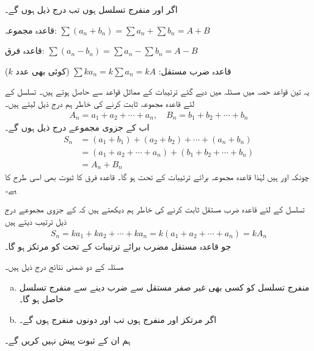 اگر  اور  منفرج تسلسل ہوں تب درج ذیل ہوں گے۔
\begin{description}
\item{قاعدہ مجموعہ:}\quad 
$\sum (a_n+b_n)=\sum a_n+\sum b_n=A+B$
\item{قاعدہ فرق:}\quad
$\sum (a_n-b_n)=\sum a_n-\sum b_n=A-B$
\item{قاعدہ ضرب مستقل:}\quad
$\sum ka_n=k\sum a_n=kA$\quad
(کوئی بھی عدد $k$)
\end{description}
یہ تین قواعد  حصہ  میں مسئلہ  میں دیے گئے ترتیبات کے مماثل قواعد سے حاصل ہوتے ہیں۔ تسلسل کے لئے قاعدہ مجموعہ ثابت کرنے کی خاطر ہم درج ذیل لیتے ہیں۔
\begin{align*}
A_n=a_1+a_2+\cdots+a_n,\quad B_n=b_1+b_2+\cdots+b_n
\end{align*}
اب  کے جزوی مجموعے درج ذیل ہوں گے۔
\begin{align*}
S_n&=(a_1+b_1)+(a_2+b_2)+\cdots+(a_n+b_n)\\
&=(a_1+a_2+\cdots+a_n)+(b_1+b_2+\cdots+b_n)\\
&=A_n+B_n
\end{align*}
چونکہ  اور  ہیں لہٰذا قاعدہ مجموعہ برائے ترتیبات کے تحت  ہو گا۔ قاعدہ فرق کا ثبوت بھی اسی طرح کا ہے۔

تسلسل کے لئے قاعدہ ضرب مستقل ثابت کرنے کی خاطر ہم دیکھتے ہیں کہ  کے جزوی مجموعے درج ذیل ترتیب دیتے ہیں
\begin{align*}
S_n=ka_1+ka_2+\cdots+ka_n=k(a_1+a_2+\cdots+a_n)=kA_n
\end{align*}
جو قاعدہ مستقل مضرب برائے ترتیبات کے تحت  کو مرتکز ہو گا۔

مسئلہ  کے دو ضمنی نتائج  درج ذیل ہیں۔ 
\begin{enumerate}[a.]
\item
منفرج تسلسل کو کسی بھی غیر صفر مستقل سے ضرب دینے سے منفرج تسلسل حاصل ہو گا۔
\item
اگر  مرتکز اور  منفرج ہوں تب  اور  دونوں منفرج ہوں گے۔ 
\end{enumerate}

ہم ان کے ثبوت پیش نہیں کریں گے۔

